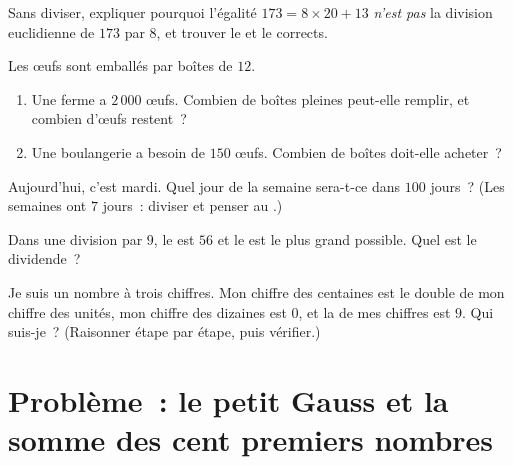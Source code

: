 \begin{exercise}[$\star$]\label{exo:g6:wholes:8}
Sans diviser, expliquer pourquoi l'égalité $173 = 8 \times 20 + 13$
\emph{n'est pas} la division euclidienne de $173$ par $8$, et trouver
le  et le  corrects.
\end{exercise}

\begin{exercise}[$\star\star$]\label{exo:g6:wholes:9}
Les œufs sont emballés par boîtes de $12$.
\begin{enumerate}
  \item Une ferme a $2\,000$ œufs. Combien de boîtes pleines
        peut-elle remplir, et combien d'œufs restent~?
  \item Une boulangerie a besoin de $150$ œufs. Combien de boîtes
        doit-elle acheter~?
\end{enumerate}
\end{exercise}

\begin{exercise}[$\star\star$]\label{exo:g6:wholes:10}
Aujourd'hui, c'est mardi. Quel jour de la semaine sera-t-ce dans
$100$ jours~? (Les semaines ont $7$ jours~: diviser et penser au
.)
\end{exercise}

\begin{exercise}[$\star\star$]\label{exo:g6:wholes:11}
Dans une division par $9$, le  est $56$ et le  est le
plus grand possible. Quel est le dividende~?
\end{exercise}

\begin{exercise}[$\star\star\star$]\label{exo:g6:wholes:12}
Je suis un nombre à trois chiffres. Mon chiffre des centaines est le
double de mon chiffre des unités, mon chiffre des dizaines est $0$, et
la  de mes chiffres est $9$. Qui suis-je~? (Raisonner étape par
étape, puis vérifier.)
\end{exercise}

\section{Problème~: le petit Gauss et la somme des cent premiers
nombres}

